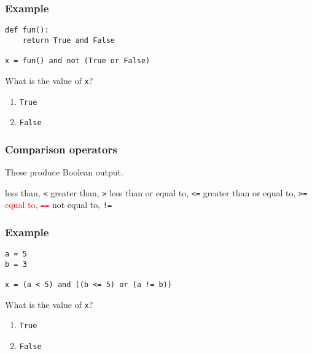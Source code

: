 \documentclass[11pt]{beamer}
\begin{document}
\begin{frame}[fragile]
  \frametitle{Example}
  \Enlarge

  \begin{Verbatim}[commandchars=\\\{\},commentchar=\%]
def fun():
    return True and False

x = fun() and not (True or False)
  \end{Verbatim}
  What is the value of \texttt{x}?
  \begin{enumerate}[label=\Alph*]
  \item  \texttt{True}
  \item  \texttt{False}  %
  \end{enumerate}
\end{frame}

\begin{frame}[fragile]
  \frametitle{Comparison operators}
  \Enlarge

  \begin{itemize}
  \myitem  These produce Boolean output.
    \begin{itemize}
    \mysubitem  less than, \texttt{<}
    \mysubitem  greater than, \texttt{>}
    \mysubitem  less than or equal to, \texttt{<=}
    \mysubitem  greater than or equal to, \texttt{>=}
    \mysubitem  \textcolor{red}{equal to, \texttt{==}}
    \mysubitem  not equal to, \texttt{!=}
    \end{itemize}
  \end{itemize}
\end{frame}

\begin{frame}[fragile]
  \frametitle{Example}
  \Enlarge

  \begin{Verbatim}[commandchars=\\\{\},commentchar=\%]
a = 5
b = 3

x = (a < 5) and ((b <= 5) or (a != b))
  \end{Verbatim}
  What is the value of \texttt{x}?
  \begin{enumerate}[label=\Alph*]
  \item  \texttt{True}
  \item  \texttt{False} %
  \end{enumerate}
\end{frame}
\end{document}
